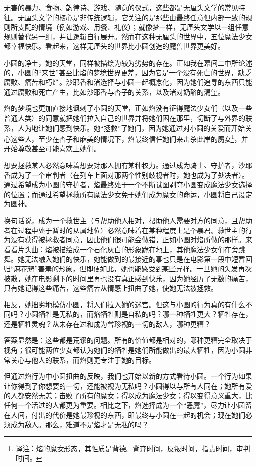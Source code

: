 无害的暴力、食物、韵律诗、游戏、随意的仪式，这些都是无厘头文学的常见特征。无厘头文学的核心是非传统逻辑，它关注的是那些由最终任意但内部一致的规则所支配的情境（例如游戏、用餐、礼仪）；就像梦一样，无厘头文学以一组任意规则替代另一组，并让逻辑自行展开。然而在这种无厘头的世界中，五位魔法少女都幸福快乐。看起来，这样无厘头的世界比小圆创造的魔兽世界更美好。

小圆的净土，她的天堂，同样被描绘为较为劣势的存在。正如我在幕间二中所论述的，小圆的“来世”甚至比焰的梦境世界更差，因为它是一个没有死亡的世界，缺乏腐败、痛苦和朽烂。沙耶香和渚选择与小圆一起概念化，因为她们追寻的东西只能通过腐败和死亡产生，比如沙耶香与杏子的关系，以及渚对奶酪的渴望。

焰的梦境也更加直接地讽刺了小圆的天堂，正如焰没有征得魔法少女们（以及一些普通人类）的同意就把她们拉入自己的世界并将她们困在那里，切断了与外界的联系，人为地让她们感到快乐。她“拯救”了她们，因为她通过对小圆的关爱而开始关心这些人，至少在杏子和麻美的情况下，焰最终信任她们来击杀此岸的魔女\footnote{译注：焰的魔女形态，其性质是背德。背弃时间，反叛时间，指责时间，审判时间。}，并开始尊敬甚至可能喜欢上她们。

想要拯救某人必然意味着想要对那人拥有某种权力。通过成为骑士、守护者，沙耶香成为了一个审判者（在列车上面对那两个性别歧视者时，她也成为了处决者）。通过希望成为小圆的守护者，焰最终处于一个不断试图剥夺小圆变成魔法少女选择的位置；而通过希望拯救所有魔法少女免于她们成为魔女的命运，小圆将自己设定为圆神。

换句话说，成为一个救世主（与帮助他人相对，帮助他人需要对方的同意，且帮助者在过程中处于暂时的从属地位）必然意味着在某种程度上是个暴君。救世主的行为没有获得被拯救者同意，因此他们很可能会做错，正如小圆对焰所做的那样。来看看片头曲：焰被描绘成一个石化灰白的形象跪在地上，其他魔法少女们在旁跳舞。她无法融入她们的快乐，她能做到的最接近的事也只是在电影第一段中短暂回归“麻花辫”害羞的形象，但即便如此，她也能感受到某些异样。一旦她的头发再次披散，她在电影剩下的时间里再也没有真正感到快乐，因为她经历了无数的痛苦，只有她记得这些痛苦，这些痛苦从情感上扭曲了她，使她无法被拯救。

相反，她拙劣地模仿小圆，将人们拉入她的迷宫。但这与小圆的行为真的有什么不同吗？小圆牺牲是无私的，而焰牺牲则是自私的吗？哪一种牺牲更大？牺牲存在，还是牺牲灵魂？从未存在过和成为曾珍视的一切的敌人，哪种更糟？

答案显然是：这些都是荒谬的问题。所有的价值都是相对的，哪种更糟完全取决于视角；很可能两位少女都认为她们的牺牲是她们所能做出的最大牺牲，因为小圆非常关心与他人的联系，而焰则更专注于她的目标。

但通过焰行为中小圆扭曲的反映，我们也开始以新的方式看待小圆。一个行为如果让你得到了你想要的一切，还能被视为无私吗？小圆得以与所有人同在；她所有爱的人都安然无恙；击败了所有的魔女；得以成为魔法少女；得以变得意义重大，比任何一个活过的人都更为重要。相比之下，焰选择成为一个“恶魔”，尽力让小圆留在人间，付出的代价是她最珍视的东西，即最终与小圆在一起的机会；现在她们必须成为敌人。那么，难道不是焰才是无私的吗？

